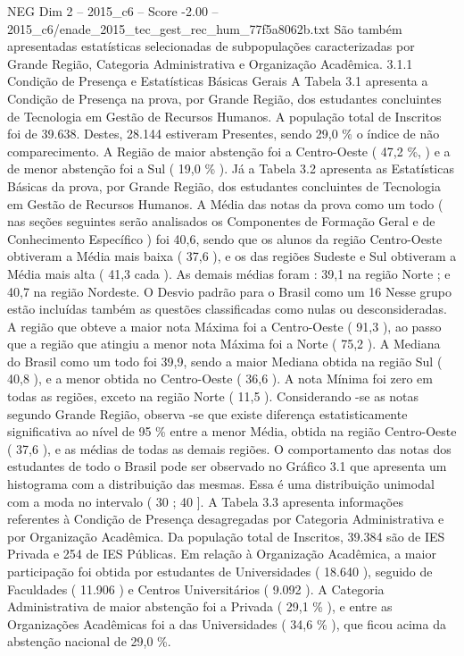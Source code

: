 \begin{textsample}{NEG Dim 2 – 2015\_c6 – Score -2.00 – 2015\_c6/enade\_2015\_tec\_gest\_rec\_hum\_77f5a8062b.txt}
São também apresentadas estatísticas selecionadas de subpopulações caracterizadas por Grande Região, Categoria Administrativa e Organização Acadêmica. 3.1.1 Condição de Presença e Estatísticas Básicas Gerais A Tabela 3.1 apresenta a Condição de Presença na prova, por Grande Região, dos estudantes concluintes de Tecnologia em Gestão de Recursos Humanos.
A população total de Inscritos foi de 39.638.
Destes, 28.144 estiveram Presentes, sendo 29,0 \% o índice de não comparecimento.
A Região de maior abstenção foi a Centro-Oeste ( 47,2 \%, ) e a de menor abstenção foi a Sul ( 19,0 \% ).
Já a Tabela 3.2 apresenta as Estatísticas Básicas da prova, por Grande Região, dos estudantes concluintes de Tecnologia em Gestão de Recursos Humanos.
A Média das notas da prova como um todo ( nas seções seguintes serão analisados os Componentes de Formação Geral e de Conhecimento Específico ) foi 40,6, sendo que os alunos da região Centro-Oeste obtiveram a Média mais baixa ( 37,6 ), e os das regiões Sudeste e Sul obtiveram a Média mais alta ( 41,3 cada ).
As demais médias foram : 39,1 na região Norte ; e 40,7 na região Nordeste.
O Desvio padrão para o Brasil como um 16 Nesse grupo estão incluídas também as questões classificadas como nulas ou desconsideradas.
A região que obteve a maior nota Máxima foi a Centro-Oeste ( 91,3 ), ao passo que a região que atingiu a menor nota Máxima foi a Norte ( 75,2 ).
A Mediana do Brasil como um todo foi 39,9, sendo a maior Mediana obtida na região Sul ( 40,8 ), e a menor obtida no Centro-Oeste ( 36,6 ).
A nota Mínima foi zero em todas as regiões, exceto na região Norte ( 11,5 ).
Considerando -se as notas segundo Grande Região, observa -se que existe diferença estatisticamente significativa ao nível de 95 \% entre a menor Média, obtida na região Centro-Oeste ( 37,6 ), e as médias de todas as demais regiões.
O comportamento das notas dos estudantes de todo o Brasil pode ser observado no Gráfico 3.1 que apresenta um histograma com a distribuição das mesmas.
Essa é uma distribuição unimodal com a moda no intervalo ( 30 ; 40 ].
A Tabela 3.3 apresenta informações referentes à Condição de Presença desagregadas por Categoria Administrativa e por Organização Acadêmica.
Da população total de Inscritos, 39.384 são de IES Privada e 254 de IES Públicas.
Em relação à Organização Acadêmica, a maior participação foi obtida por estudantes de Universidades ( 18.640 ), seguido de Faculdades ( 11.906 ) e Centros Universitários ( 9.092 ).
A Categoria Administrativa de maior abstenção foi a Privada ( 29,1 \% ), e entre as Organizações Acadêmicas foi a das Universidades ( 34,6 \% ), que ficou acima da abstenção nacional de 29,0 \%.

\end{textsample}
